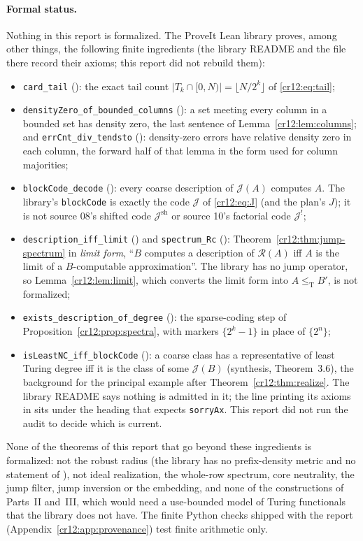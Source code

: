 \documentclass[11pt,letterpaper]{article}
\theoremstyle{plain}
\theoremstyle{definition}
\theoremstyle{remark}
\numberwithin{equation}{section}
\newcommand{\leT}{\leq_{\mathrm T}}
\newcommand{\Rcode}{\mathcal R}
\newcommand{\Jcode}{\mathcal J}
\newcommand{\Jsh}{\mathcal J^{\mathrm{sh}}} %
\newcommand{\Jfac}{\mathcal J^{!}}       %
\begin{document}
\paragraph{Formal status.} Nothing in this report is formalized. The ProveIt Lean
library  proves, among other
things, the following finite ingredients (the library README and the file
 there record their axioms; this report did not rebuild them):
\begin{itemize}
\item \texttt{card\_tail} (): the exact tail count
 $|T_k\cap[0,N)|=\lfloor N/2^k\rfloor$ of \eqref{cr12:eq:tail};
\item \texttt{densityZero\_of\_bounded\_columns} (): a set meeting
 every column in a bounded set has density zero, the last sentence of
 Lemma~\ref{cr12:lem:columns}; and \texttt{errCnt\_div\_tendsto}
 (): density-zero errors have relative density zero in each
 column, the forward half of that lemma in the form used for column majorities;
\item \texttt{blockCode\_decode} (): every coarse description of
 $\Jcode(A)$ computes $A$. The library's \texttt{blockCode} is exactly the code
 $\Jcode$ of \eqref{cr12:eq:J} (and the plan's $J$); it is not source 08's shifted
 code $\Jsh$ or source 10's factorial code $\Jfac$;
\item \texttt{description\_iff\_limit} () and
 \texttt{spectrum\_Rc} (): Theorem~\ref{cr12:thm:jump-spectrum}
 in \emph{limit form}, ``$B$ computes a description of $\Rcode(A)$ iff $A$ is the
 limit of a $B$-computable approximation''. The library has no jump operator, so
 Lemma~\ref{cr12:lem:limit}, which converts the limit form into $A\leT B'$, is not
 formalized;
\item \texttt{exists\_description\_of\_degree} (): the
 sparse-coding step of Proposition~\ref{cr12:prop:spectra}, with markers
 $\{2^k-1\}$ in place of $\{2^n\}$;
\item \texttt{isLeastNC\_iff\_blockCode} (): a coarse class has
 a representative of least Turing degree iff it is the class of some $\Jcode(B)$
 (synthesis, Theorem~3.6), the background for the principal example after
 Theorem~\ref{cr12:thm:realize}. The library README says nothing is admitted in it;
 the line printing its axioms in  sits under the heading that
 expects \texttt{sorryAx}. This report did not run the audit to decide which is
 current.
\end{itemize}
None of the theorems of this report that go beyond these ingredients is
formalized: not the robust radius (the library has no prefix-density metric and
no statement of \cite[Theorem~3.7]{HJKS}), not ideal realization, the whole-row
spectrum, core neutrality, the jump filter, jump inversion or the embedding, and
none of the constructions of Parts~II and~III, which would need a use-bounded
model of Turing functionals that the library does not have. The finite Python
checks shipped with the report (Appendix~\ref{cr12:app:provenance}) test finite
arithmetic only.
\end{document}
